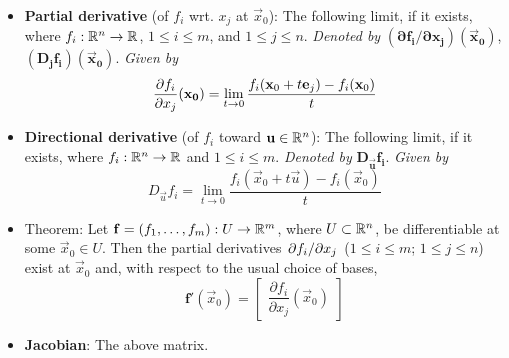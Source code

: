 \documentclass[../notes.tex]{subfiles}
\begin{document}
\begin{itemize}
\begin{itemize}
    \end{itemize}
    \item \textbf{Partial derivative} (of $f_i$ wrt. $x_j$ at $\vec{x}_0$): The following limit, if it exists, where $f_i:\mathbb{R}^n\to\mathbb{R}$, $1\leq i\leq m$, and $1\leq j\leq n$. \emph{Denoted by} $\bm{(\partial f_i/\partial x_j)(\vec{x}_0)}$, $\bm{(D_jf_i)(\vec{x}_0)}$. \emph{Given by}
    \begin{equation*}
        {\pdv{f_i}{x_j}}(\mathbf{x_0}) = \lim_{t\to 0}\frac{f_i(\mathbf{x}_0+t\mathbf{e}_j)-f_i(\mathbf{x}_0)}{t}
    \end{equation*}
    \item \textbf{Directional derivative} (of $f_i$ toward $\mathbf{u}\in\mathbb{R}^n$): The following limit, if it exists, where $f_i:\mathbb{R}^n\to\mathbb{R}$ and $1\leq i\leq m$. \emph{Denoted by} $\bm{D_\vec{u}f_i}$. \emph{Given by}
    \begin{equation*}
        D_\vec{u}f_i = \lim_{t\to 0}\frac{f_i(\vec{x}_0+t\vec{u})-f_i(\vec{x}_0)}{t}
    \end{equation*}
    \item Theorem: Let $\mathbf{f}=(f_1,\dots,f_m):U\to\mathbb{R}^m$, where $U\subset\mathbb{R}^n$, be differentiable at some $\vec{x}_0\in U$. Then the partial derivatives $\pdv*{f_i}{x_j}$ ($1\leq i\leq m$; $1\leq j\leq n$) exist at $\vec{x}_0$ and, with respect to the usual choice of bases,
    \begin{equation*}
        \mathbf{f}'(\vec{x}_0) =
        \begin{bmatrix}
            \dfrac{\partial f_i}{\partial x_j}(\vec{x}_0)
        \end{bmatrix}
    \end{equation*}
    \item \textbf{Jacobian}: The above matrix.
\end{itemize}
\end{document}
